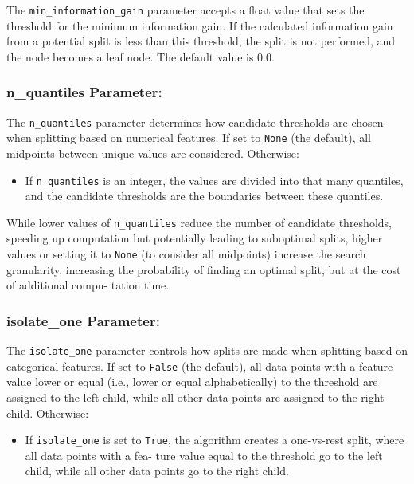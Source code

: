 \documentclass{article}
\begin{document}
The \texttt{min\_information\_gain} parameter accepts a float value that sets the threshold for the minimum information gain. If the calculated information gain from a potential split is less than this threshold, the split is not performed, and the node becomes a leaf node. The default value is 0.0.

\subsubsection*{n\_quantiles Parameter:}

The \texttt{n\_quantiles} parameter determines how candidate thresholds are chosen when splitting based on numerical features. If set to \texttt{None} (the default), all midpoints between unique values are considered. Otherwise:

\begin{itemize}
    \item If \texttt{n\_quantiles} is an integer, the values are divided into that many quantiles, and the candidate thresholds are the boundaries between these quantiles.
\end{itemize}

While lower values of \texttt{n\_quantiles} reduce the number of candidate thresholds, speeding up computation but potentially leading to suboptimal splits, higher values or setting it to \texttt{None} (to consider all midpoints) increase the search granularity, increasing the probability of finding an optimal split, but at the cost of additional compu- tation time.

\subsubsection*{isolate\_one Parameter:}

The \texttt{isolate\_one} parameter controls how splits are made when splitting based on categorical features. If set to \texttt{False} (the default), all data points with a feature value lower or equal (i.e., lower or equal alphabetically) to the threshold are assigned to the left child, while all other data points are assigned to the right child. Otherwise:

\begin{itemize}
\item If \texttt{isolate\_one} is set to \texttt{True}, the algorithm creates a one-vs-rest split, where all data points with a fea- ture value equal to the threshold go to the left child, while all other data points go to the right child.
\end{itemize}
\end{document}
